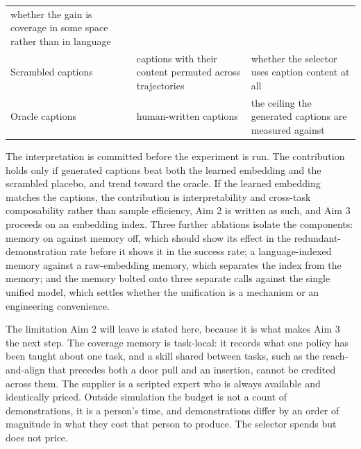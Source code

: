 \documentclass[
  11pt,
]{article}
\begin{document}
\begin{longtable}[]{@{}lll@{}}
\begin{minipage}[t]{0.30\columnwidth}
whether the gain is coverage in some space rather than in language\strut
\end{minipage}\tabularnewline
\begin{minipage}[t]{0.30\columnwidth}\raggedright
Scrambled captions\strut
\end{minipage} & \begin{minipage}[t]{0.30\columnwidth}\raggedright
captions with their content permuted across trajectories\strut
\end{minipage} & \begin{minipage}[t]{0.30\columnwidth}\raggedright
whether the selector uses caption content at all\strut
\end{minipage}\tabularnewline
\begin{minipage}[t]{0.30\columnwidth}\raggedright
Oracle captions\strut
\end{minipage} & \begin{minipage}[t]{0.30\columnwidth}\raggedright
human-written captions\strut
\end{minipage} & \begin{minipage}[t]{0.30\columnwidth}\raggedright
the ceiling the generated captions are measured against\strut
\end{minipage}\tabularnewline
\bottomrule
\end{longtable}

The interpretation is committed before the experiment is run. The
contribution holds only if generated captions beat both the learned
embedding and the scrambled placebo, and trend toward the oracle. If the
learned embedding matches the captions, the contribution is
interpretability and cross-task composability rather than sample
efficiency, Aim 2 is written as such, and Aim 3 proceeds on an embedding
index. Three further ablations isolate the components: memory on against
memory off, which should show its effect in the redundant-demonstration
rate before it shows it in the success rate; a language-indexed memory
against a raw-embedding memory, which separates the index from the
memory; and the memory bolted onto three separate calls against the
single unified model, which settles whether the unification is a
mechanism or an engineering convenience.

The limitation Aim 2 will leave is stated here, because it is what makes
Aim 3 the next step. The coverage memory is task-local: it records what
one policy has been taught about one task, and a skill shared between
tasks, such as the reach-and-align that precedes both a door pull and an
insertion, cannot be credited across them. The supplier is a scripted
expert who is always available and identically priced. Outside
simulation the budget is not a count of demonstrations, it is a person's
time, and demonstrations differ by an order of magnitude in what they
cost that person to produce. The selector spends but does not price.
\end{document}
